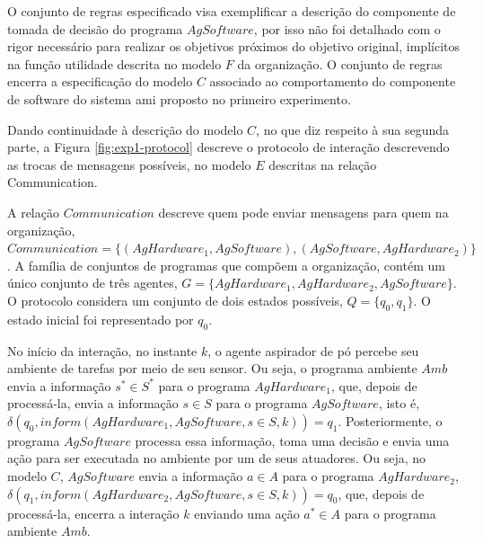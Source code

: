 O conjunto de regras especificado visa exemplificar a descrição do componente de tomada de decisão do programa $AgSoftware$, por isso não foi detalhado com o rigor necessário para realizar os objetivos próximos do objetivo original, implícitos na função utilidade descrita no modelo $F$ da organização. O conjunto de regras encerra a especificação do modelo $C$ associado ao comportamento do componente de software do sistema \acrshort{ami} proposto no primeiro experimento.

Dando continuidade à descrição do modelo $C$, no que diz respeito à sua segunda parte, a Figura \ref{fig:exp1-protocol} descreve o protocolo de interação descrevendo as trocas de mensagens possíveis, no modelo $E$ descritas na relação Communication.

\begin{figure}[h!]
    \centering
\end{figure}

A relação $Communication$ descreve quem pode enviar mensagens para quem na organização, $Communication = \{(AgHardware_1, AgSoftware), (AgSoftware, AgHardware_2)\}$. A família de conjuntos de programas que compõem a organização, contém um único conjunto de três agentes, $G = \{{AgHardware_1, AgHardware_2, AgSoftware}\}$. O protocolo considera um conjunto de dois estados possíveis, $Q = \{q_0, q_1\}$. O estado inicial foi representado por $q_0$.

No início da interação, no instante $k$, o agente aspirador de pó percebe seu ambiente de tarefas por meio de seu sensor. Ou seja, o programa ambiente $Amb$ envia a informação $s^* \in S^*$ para o programa $AgHardware_1$, que, depois de processá-la, envia a informação $s \in S$ para o programa $AgSoftware$, isto é, $\delta(q_0, inform(AgHardware_1, AgSoftware, s \in S, k)) = q_1$. Posteriormente, o programa $AgSoftware$ processa essa informação, toma uma decisão e envia uma ação para ser executada no ambiente por um de seus atuadores. Ou seja, no modelo $C$, $AgSoftware$ envia a informação $a \in A$ para o programa $AgHardware_2$, $\delta(q_1, inform(AgHardware_2, AgSoftware, s \in S, k)) = q_0$, que, depois de processá-la, encerra a interação $k$ enviando uma ação $a^* \in A$ para o programa ambiente $Amb$.

